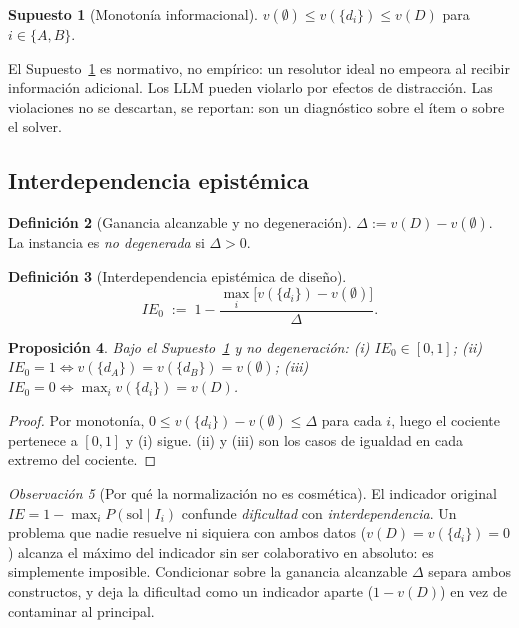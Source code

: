 \documentclass[11pt,a4paper]{article}
\theoremstyle{definition}
\newtheorem{definicion}{Definición}[section]
\newtheorem{supuesto}[definicion]{Supuesto}
\theoremstyle{plain}
\newtheorem{proposicion}[definicion]{Proposición}
\theoremstyle{remark}
\newtheorem{observacion}[definicion]{Observación}
\begin{document}
\begin{supuesto}[Monotonía informacional]\label{sup:monotonia}
$v(\emptyset)\le v(\{d_i\})\le v(D)$ para $i\in\{A,B\}$.
\end{supuesto}

El Supuesto~\ref{sup:monotonia} es normativo, no empírico: un resolutor ideal no
empeora al recibir información adicional. Los LLM pueden violarlo por efectos de
distracción. Las violaciones no se descartan, se reportan: son un diagnóstico
sobre el ítem o sobre el solver.

\subsection{Interdependencia epistémica}

\begin{definicion}[Ganancia alcanzable y no degeneración]
$\Delta := v(D)-v(\emptyset)$. La instancia es \emph{no degenerada} si
$\Delta>0$.
\end{definicion}

\begin{definicion}[Interdependencia epistémica de diseño]\label{def:ie0}
\[
  IE_0 \;:=\; 1-\frac{\max_i\big[v(\{d_i\})-v(\emptyset)\big]}{\Delta}.
\]
\end{definicion}

\begin{proposicion}\label{prop:ie}
Bajo el Supuesto~\ref{sup:monotonia} y no degeneración:
\emph{(i)} $IE_0\in[0,1]$;
\emph{(ii)} $IE_0=1 \iff v(\{d_A\})=v(\{d_B\})=v(\emptyset)$;
\emph{(iii)} $IE_0=0 \iff \max_i v(\{d_i\})=v(D)$.
\end{proposicion}

\begin{proof}
Por monotonía, $0\le v(\{d_i\})-v(\emptyset)\le \Delta$ para cada $i$, luego el
cociente pertenece a $[0,1]$ y (i) sigue. (ii) y (iii) son los casos de igualdad
en cada extremo del cociente.
\end{proof}

\begin{observacion}[Por qué la normalización no es cosmética]\label{obs:normalizacion}
El indicador original $IE = 1-\max_i P(\text{sol}\mid I_i)$ confunde
\emph{dificultad} con \emph{interdependencia}. Un problema que nadie resuelve ni
siquiera con ambos datos ($v(D)=v(\{d_i\})=0$) alcanza el máximo del indicador sin
ser colaborativo en absoluto: es simplemente imposible. Condicionar sobre la
ganancia alcanzable $\Delta$ separa ambos constructos, y deja la dificultad como
un indicador aparte ($1-v(D)$) en vez de contaminar al principal.
\end{observacion}
\end{document}
